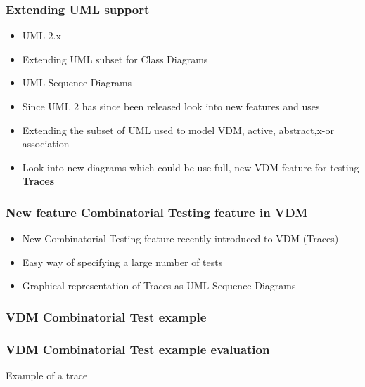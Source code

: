 %
%
\frame
{
  \frametitle{Extending UML support}

  \begin{itemize}
	\itemsep=1cm
  		\item<1-> UML 2.x
  		\item<2-> Extending UML subset for Class Diagrams
  		\item<3-> UML Sequence Diagrams
	  	
  \end{itemize}


}

\note
{

  \begin{itemize}
  		\item Since UML 2 has since been released look into new features and uses
  		\item Extending the subset of UML used to model VDM, active, abstract,x-or association
  		\item Look into new diagrams which could be use full, new VDM feature for testing \textbf{Traces}
	  	
  \end{itemize}

}


%
%
\frame
{
  \frametitle{New feature Combinatorial Testing feature in VDM}

  \begin{itemize}
  		\item New Combinatorial Testing feature recently introduced to VDM (Traces)
  		\item Easy way of specifying a large number of tests
  		\item Graphical representation of Traces as UML Sequence Diagrams
	  	
  \end{itemize}


}

%
%
\frame
{
  \frametitle{VDM Combinatorial Test example}
\begin{center}

\end{center}
}

%
%
\frame
{
  \frametitle{VDM Combinatorial Test example evaluation}
\begin{center}
Example of a trace

\end{center}
}


